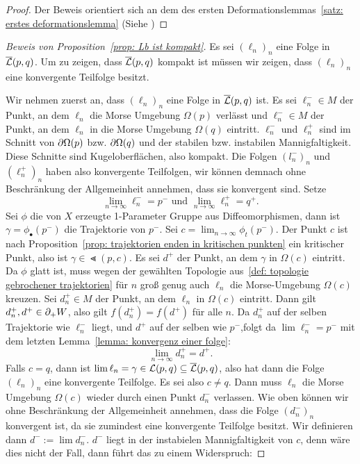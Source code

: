 \begin{proof}
    Der Beweis orientiert sich an dem des ersten Deformationslemmas~\ref{satz: erstes deformationslemma}
    (Siehe \cite{audin})
\end{proof}

\begin{proof}[Beweis von Proposition~\ref{prop: Lb ist kompakt}]
    Es sei $(\ell_n)_n$ eine Folge in ${\overline{\mathcal{L}} } (p, q)$. Um zu zeigen, dass ${\overline{\mathcal{L}} } (p, q)$ kompakt ist
    müssen wir zeigen, dass $(\ell_n)_n$ eine konvergente Teilfolge besitzt.

    Wir nehmen zuerst an, dass $(\ell_n)_n$ eine Folge in ${\overline{\mathcal{L}} } (p, q)$ ist.
    Es sei $\ell_n^- \in M$ der Punkt, an dem $\ell_n$ die Morse Umgebung $\Omega(p)$ verlässt 
    und $\ell_n^- \in M$ der Punkt, an dem $\ell_n$ in die Morse Umgebung $\Omega(q)$ eintritt.
    $\ell_n^-$ und $\ell_n^+$ sind im Schnitt von ${ \partial } \Omega (p)$ bzw. ${ \partial } \Omega (q)$ und 
    der stabilen bzw. instabilen Mannigfaltigkeit. Diese Schnitte sind Kugeloberflächen, also 
    kompakt. Die Folgen $(l_n^-)_n$ und $(\ell_n^+)_n$ haben also konvergente Teilfolgen, wir können 
    demnach ohne Beschränkung der Allgemeinheit annehmen, dass sie konvergent sind. Setze
    \[ \lim_{n \to \infty} \ell_n^- = p^- \text{ und } \lim_{n \to \infty} \ell_n^+ = q^+ . \]
    Sei $\phi$ die von $X$ erzeugte 1-Parameter Gruppe aus Diffeomorphismen, dann ist 
    $\gamma = \phi_{\bullet}(p^-)$ die Trajektorie von $p^-$. Sei 
    $c = \lim_{n \to \infty} \phi_t(p^-)$. Der Punkt $c$ ist nach 
    Proposition~\ref{prop: trajektorien enden in kritischen punkten} ein kritischer Punkt,
    also ist $\gamma \in \Lt (p, c)$.  Es sei $d^+$ der Punkt, an dem $\gamma$ in $\Omega (c)$ 
    eintritt. Da $\phi$ glatt ist, muss wegen der gewählten Topologie 
    aus~\ref{def: topologie gebrochener trajektorien} für $n$ groß genug auch $\ell_n$ die 
    Morse-Umgebung $\Omega (c)$ kreuzen. Sei $d_n^+ \in M$ der Punkt, an dem $\ell_n$ in 
    $\Omega (c)$ eintritt. 
    Dann gilt $d_n^+, d^+ \in { \partial }_+ W$, also gilt $f(d_n^+) = f(d^+)$ für alle $n$. Da $d_n^+$ auf 
    der selben Trajektorie wie $\ell_n^-$ liegt, und $d^+$ auf der selben wie $p^-$,folgt da 
    $\lim \ell_n^- = p^-$ mit dem letzten Lemma~\ref{lemma: konvergenz einer folge}: 
    \[ \lim_{n \to \infty} d_n^+ = d^+ . \]
    Falls $c = q$, dann ist $\lim \ell_n = \gamma \in { \mathcal{L} } (p, q) \subseteq {\overline{\mathcal{L}} } (p, q)$, also hat 
    dann die Folge $(\ell_n)_n$ eine konvergente Teilfolge. Es sei also $c \neq q$. Dann muss 
    $\ell_n$ die Morse Umgebung $\Omega (c)$ wieder durch einen Punkt $d_n^-$ verlassen. Wie oben 
    können wir ohne Beschränkung der Allgemeinheit annehmen, dass die Folge $(d_n^-)_n$ konvergent 
    ist, da sie zumindest eine konvergente Teilfolge besitzt. Wir definieren dann $d^- := \lim d_n^-$. 
    $d^-$ liegt in der instabielen Mannigfaltigkeit von $c$, denn wäre dies nicht der Fall, dann 
    führt das zu einem Widerspruch:
    

\end{proof}
